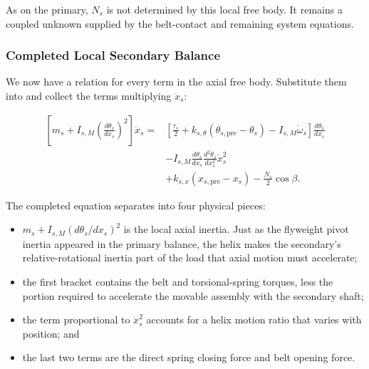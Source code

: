 \documentclass[11pt]{report}
\numberwithin{equation}{section}
\begin{document}
As on the primary, \(N_s\) is not determined by this local free body. It
remains a coupled unknown supplied by the belt-contact and remaining system
equations.

\subsubsection{Completed Local Secondary Balance}
\label{sec:completed_secondary_balance}

We now have a relation for every term in the axial free body. Substitute them
into
 and collect the terms multiplying
\(\ddot x_s\):

\begin{equation}
\boxed{
\begin{aligned}
    \left[
        m_s
        +
        I_{s,M}
        \left(\frac{d\theta_s}{dx_s}\right)^2
    \right]\ddot x_s
    ={}&
    \left[
        \frac{\tau_s}{2}
        +
        k_{s,\theta}
        \left(
            \theta_{s,\mathrm{pre}}-\theta_s
        \right)
        -
        I_{s,M}\dot\omega_s
    \right]
    \frac{d\theta_s}{dx_s}
    \\
    &-
    I_{s,M}
    \frac{d\theta_s}{dx_s}
    \frac{d^2\theta_s}{dx_s^2}
    \dot x_s^2
    \\
    &+
    k_{s,x}
    \left(x_{s,\mathrm{pre}}-x_s\right)
    -
        \frac{N_s}{2}\cos\beta.
\end{aligned}
}
    \label{eq:completed_secondary_axial_balance}
\end{equation}

The completed equation separates into four physical pieces:

\begin{itemize}
    \item \(m_s+I_{s,M}(d\theta_s/dx_s)^2\) is the local axial inertia. Just
    as the flyweight pivot inertia appeared in the primary balance, the helix
    makes the secondary's relative-rotational inertia part of the load that
    axial motion must accelerate;
    \item the first bracket contains the belt and torsional-spring torques,
    less the portion required to accelerate the movable assembly with the
    secondary shaft;
    \item the term proportional to \(\dot x_s^2\) accounts for a helix motion
    ratio that varies with position; and
    \item the last two terms are the direct spring closing force and belt
    opening force.
\end{itemize}
\end{document}

